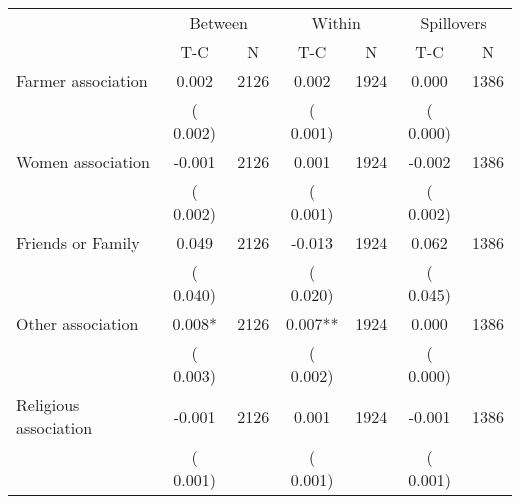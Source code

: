 
\begin{tabular}{l*{6}{c}}\hline&\multicolumn{2}{c}{Between}&\multicolumn{2}{c}{Within}&\multicolumn{2}{c}{Spillovers} \\ \cmidrule(r){2-3}\cmidrule(l){4-5}\cmidrule(l){6-7} & {T-C} & {N} & {T-C} & {N}  & {T-C}  & {N}  \\ \midrule
Farmer association        &              0.002      &       2126       &              0.002      &       1924       &              0.000      &       1386       \\
                       &       (       0.002)            &                               &       (       0.001)            &                               &       (       0.000)            &                               \\
Women association        &             -0.001      &       2126       &              0.001      &       1924       &             -0.002      &       1386       \\
                       &       (       0.002)            &                               &       (       0.001)            &                               &       (       0.002)            &                               \\
Friends or Family        &              0.049      &       2126       &             -0.013      &       1924       &              0.062      &       1386       \\
                       &       (       0.040)            &                               &       (       0.020)            &                               &       (       0.045)            &                               \\
Other association        &              0.008*      &       2126       &              0.007**      &       1924       &              0.000      &       1386       \\
                       &       (       0.003)            &                               &       (       0.002)            &                               &       (       0.000)            &                               \\
Religious association        &             -0.001      &       2126       &              0.001      &       1924       &             -0.001      &       1386       \\
                       &       (       0.001)            &                               &       (       0.001)            &                               &       (       0.001)            &                               \\

\end{tabular}
